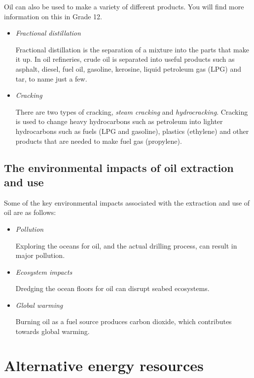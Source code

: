 Oil can also be used to make a variety of different products. You will find more information on this in Grade 12.

\begin{itemize}
\item{\textit{Fractional distillation}

Fractional distillation is the separation of a mixture into the parts that make it up. In oil refineries, crude oil is separated into useful products such as asphalt, diesel, fuel oil, gasoline, kerosine, liquid petroleum gas (LPG) and tar, to name just a few.
}

\item{\textit{Cracking}

There are two types of cracking, \textit{steam cracking} and \textit{hydrocracking}. Cracking is used to change heavy hydrocarbons such as petroleum into lighter hydrocarbons such as fuels (LPG and gasoline), plastics (ethylene) and other products that are needed to make fuel gas (propylene).
}
\end{itemize}

\subsection{The environmental impacts of oil extraction and use}

Some of the key environmental impacts associated with the extraction and use of oil are as follows:

\begin{itemize}
\item{\textit{Pollution}

Exploring the oceans for oil, and the actual drilling process, can result in major pollution.}

\item{\textit{Ecosystem impacts}

Dredging the ocean floors for oil can disrupt seabed ecosystems.
}

\item{\textit{Global warming}

Burning oil as a fuel source produces carbon dioxide, which contributes towards global warming.
}
\end{itemize}






\section{Alternative energy resources}
\label{sec:mining:alternative energy}


